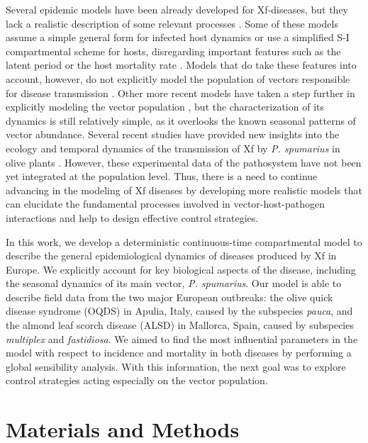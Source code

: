 Several epidemic models have been already developed for Xf-diseases, but
they lack a realistic description of some relevant processes
\cite{Jeger2019}. Some of these models assume a simple general form for
infected host dynamics \cite{White2017,Abboud2019,Daugherty2019} or use a
simplified S-I compartmental scheme for hosts, disregarding important features
such as the latent period or the host mortality rate \cite{Soubeyrand2018}.
Models that do take these features into account, however, do not explicitly
model the population of vectors responsible for disease transmission
\cite{White2020}. Other more recent models have taken a step further in
explicitly modeling the vector population \cite{BRUNETTI2020,
    GimenezRomero2022_CommsBio}, but the characterization of its dynamics is
still
relatively simple, as it overlooks the known seasonal patterns of vector
abundance. Several recent studies have provided new insights into the ecology
and temporal dynamics of the transmission of Xf by \textit{P. spumarius} in
olive plants \cite{Bodino2021,bodino2019phenology}. However, these
experimental data of the pathosystem have not been yet integrated at the
population level. Thus, there is a need to continue advancing in the modeling
of Xf diseases by developing more realistic models that can elucidate the
fundamental processes involved in vector-host-pathogen interactions and help to
design effective control strategies.

In this work, we develop a deterministic continuous-time compartmental
model to describe the general epidemiological dynamics of diseases produced by
Xf in Europe. We explicitly account for key biological aspects of the disease,
including the seasonal dynamics of its main vector, \textit{P. spumarius}. Our
model is able to describe field data from the two major European outbreaks: the
olive quick disease syndrome (OQDS) in Apulia, Italy, caused by the subspecies
\textit{pauca}, and the almond leaf scorch disease (ALSD) in Mallorca, Spain,
caused by subspecies \textit{multiplex} and \textit{fastidiosa}. We aimed to
find the most influential parameters in the model with respect to incidence and
mortality in both diseases by performing a global sensibility analysis. With
this information, the next goal was to explore control strategies acting
especially on the vector population.

\section{Materials and Methods}

